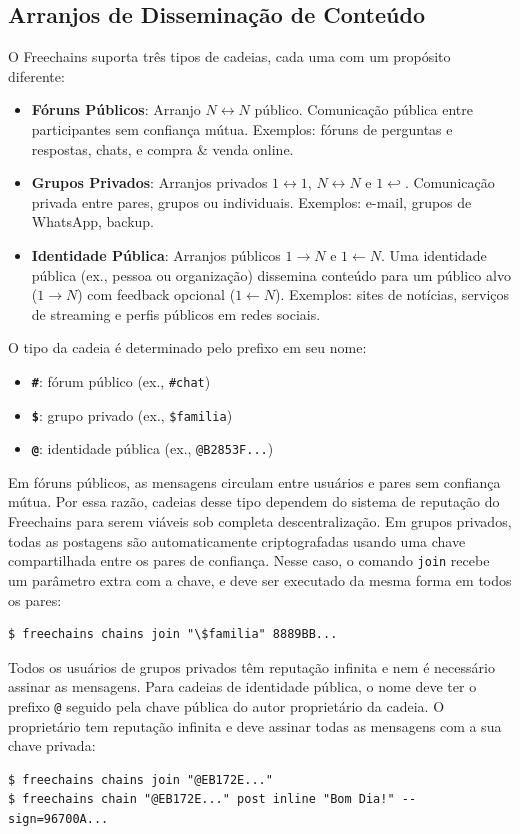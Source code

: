\documentclass[12pt]{article}
\newcommand{\FC} {Freechains\xspace}
\newcommand{\Xon} {$1{\rightarrow}N$\xspace}
\newcommand{\Xno} {$1{\leftarrow}N$\xspace}
\newcommand{\Xnn} {$N{\leftrightarrow}N$\xspace}
\newcommand{\Xoo} {$1{\leftrightarrow}1$\xspace}
\newcommand{\Xo}  {$1{\hookleftarrow}$\xspace}
\begin{document}
\subsection{Arranjos de Disseminação de Conteúdo}

O \FC suporta três tipos de cadeias, cada uma com um propósito diferente:
%
\begin{itemize}
\item \textbf{Fóruns Públicos}:
    Arranjo \Xnn público.
    Comunicação pública entre participantes sem confiança mútua.
    Exemplos: fóruns de perguntas e respostas, chats, e compra \& venda online.
\item \textbf{Grupos Privados}:
    Arranjos privados \Xoo, \Xnn e \Xo.
    Comunicação privada entre pares, grupos ou individuais.
    Exemplos: e-mail, grupos de WhatsApp, backup.
\item \textbf{Identidade Pública}:
    Arranjos públicos \Xon e \Xno.
    Uma identidade pública (ex., pessoa ou organização) dissemina conteúdo para
    um público alvo (\Xon) com feedback opcional (\Xno).
    Exemplos: sites de notícias, serviços de streaming e perfis públicos em
    redes sociais.
\end{itemize}
%
O tipo da cadeia é determinado pelo prefixo em seu nome:
%
\begin{itemize}
    \item \textbf{\texttt{\#}}: fórum público (ex., \texttt{\#chat})
    \item \textbf{\texttt{\$}}: grupo privado (ex., \texttt{\$familia})
    \item \textbf{\texttt{@}}: identidade pública (ex., \texttt{@B2853F...})
\end{itemize}

Em fóruns públicos, as mensagens circulam entre usuários e pares sem confiança
mútua.
Por essa razão, cadeias desse tipo dependem do sistema de reputação do \FC para
serem viáveis sob completa descentralização.
%
Em grupos privados, todas as postagens são automaticamente criptografadas
usando uma chave compartilhada entre os pares de confiança.
Nesse caso, o comando \texttt{join} recebe um parâmetro extra com a chave, e
deve ser executado da mesma forma em todos os pares:
%
{\footnotesize
\begin{verbatim}
$ freechains chains join "\$familia" 8889BB...
\end{verbatim}
}
%
Todos os usuários de grupos privados têm reputação infinita e nem é necessário
assinar as mensagens.
%
Para cadeias de identidade pública, o nome deve ter o prefixo \texttt{@}
seguido pela chave pública do autor proprietário da cadeia.
O proprietário tem reputação infinita e deve assinar todas as mensagens com a
sua chave privada:
%
{\footnotesize
\begin{verbatim}
$ freechains chains join "@EB172E..."
$ freechains chain "@EB172E..." post inline "Bom Dia!" --sign=96700A...
\end{verbatim}
}
\end{document}
